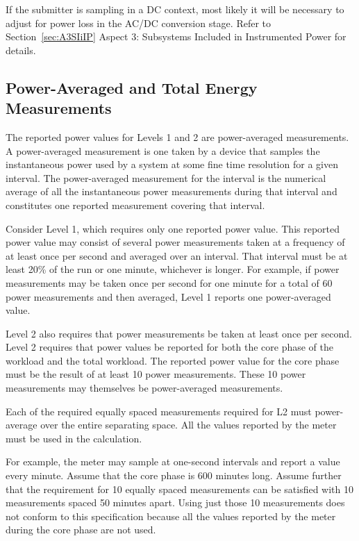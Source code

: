 \noindent
If the submitter is sampling in a DC context, most likely it will be necessary to adjust for power loss in the AC/DC conversion stage. 
Refer to Section~\ref{sec:A3SIiIP} Aspect 3: Subsystems Included in Instrumented Power for details.

\subsection{Power-Averaged and Total Energy Measurements}
\label{sec:PAaTEM}
\noindent
The reported power values for Levels 1 and 2 are power-averaged measurements. A power-averaged measurement is one taken by a device that samples the instantaneous power used by a system at some fine time resolution for a given interval. The power-averaged measurement for the interval is the numerical average of all the instantaneous power measurements during that interval and constitutes one reported measurement covering that interval. 
\wl

\noindent
Consider Level 1, which requires only one reported power value. This reported power value may consist of several power measurements taken at a frequency of at least once per second and averaged over an interval. That interval must be at least 20\% of the run or one minute, whichever is longer. For example, if power measurements may be taken once per second for one minute for a total of 60 power measurements and then averaged, Level 1 reports one power-averaged value.
\wl

\noindent
Level 2 also requires that power measurements be taken at least once per second. Level 2 requires that power values be reported for both the core phase of the workload and the total workload. The reported power value for the core phase must be the result of at least 10 power measurements. These 10 power measurements may themselves be power-averaged measurements.
\wl

\noindent
Each of the required equally spaced measurements required for L2 must power-average over the entire separating space.  All the values reported by the meter must be used in the calculation.
\wl

\noindent
For example, the meter may sample at one-second intervals and report a value every minute. Assume that the core phase is 600 minutes long. Assume further that the requirement for 10 equally spaced measurements can be satisfied with 10 measurements spaced 50 minutes apart. Using just those 10 measurements does not conform to this specification because all the values reported by the meter during the core phase are not used. 
\wl

